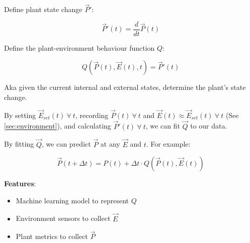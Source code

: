 \documentclass{report}
\begin{document}
Define plant state change $\vec P'$: 

$$\vec P'(t) = \frac{d}{dt}\vec P(t)$$

Define the plant-environment behaviour function $Q$: 

$$Q(\vec P(t), \vec E(t), t)=\vec P'(t)$$ 

Aka given the current internal and external states, determine the plant's state change.

By setting $\vec E_{set}(t)~\forall~ t$, recording $\vec P(t)~\forall~ t$ and $\vec E(t)\approx \vec E_{set}(t)~\forall~ t$ (See \ref{sec:environment}), and calculating $\vec P'(t)~\forall~ t$, we can fit $\vec Q$ to our data.

By fitting $\vec Q$, we can predict $\vec P$ at any $\vec E$ and $t$. For example:

$$\vec P(t+\Delta t)=P(t)+\Delta t\cdot Q(\vec P(t),\vec E(t))$$

\textbf{Features}:
\begin{itemize}
    \item Machine learning model to represent $Q$
    \item Environment sensors to collect $\vec E$
    \item Plant metrics to collect $\vec P$
\end{itemize}

\newpage



\end{document}
